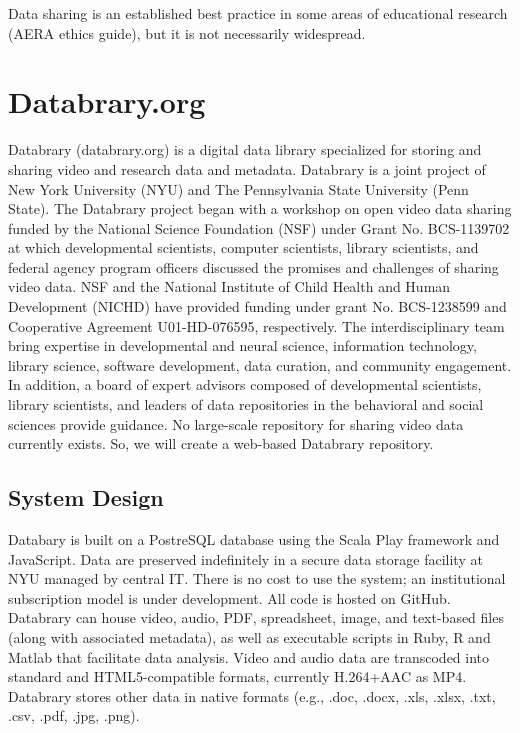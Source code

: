 \documentclass[letterpaper,man,natbib]{apa6}
\begin{document}
Data sharing is an established best practice in some areas of educational research (AERA ethics guide), but it is not necessarily widespread.

\section{Databrary.org}
Databrary (databrary.org) is a digital data library specialized for storing and sharing video and research data and metadata.
Databrary is a joint project of New York University (NYU) and The Pennsylvania State University (Penn State). 
The Databrary project began with a workshop on open video data sharing funded by the National
Science Foundation (NSF) under Grant No. BCS-1139702 at which developmental scientists, computer scientists, library scientists, and federal agency program officers discussed the promises and challenges of
sharing video data. 
NSF and the National Institute of Child Health and Human Development (NICHD) have provided funding under grant No. BCS-1238599 and Cooperative Agreement U01-HD-076595, respectively. 
The interdisciplinary team bring expertise in developmental and neural
science, information technology, library science, software development,
data curation, and community engagement. 
In addition, a board of expert
advisors composed of developmental scientists, library scientists, and
leaders of data repositories in the behavioral and social sciences
provide guidance.
No large-scale repository for sharing video data currently exists. So, we will create a web-based Databrary repository. 

\subsection{System Design}

Databary is built on a PostreSQL database using the Scala Play framework and JavaScript.
Data are preserved indefinitely in a secure data storage facility at NYU managed by central IT.
There is no cost to use the system; an institutional subscription model is under development.
All code is hosted on GitHub.
Databrary can house video, audio, PDF, spreadsheet, image, and text-based files (along with associated metadata), as well as executable scripts in Ruby, R and Matlab that facilitate data analysis.
Video and audio data are transcoded into standard and HTML5-compatible formats, currently H.264+AAC as MP4. Databrary stores other data in native formats (e.g., .doc, .docx, .xls, .xlsx, .txt, .csv, .pdf, .jpg, .png).
\end{document}
